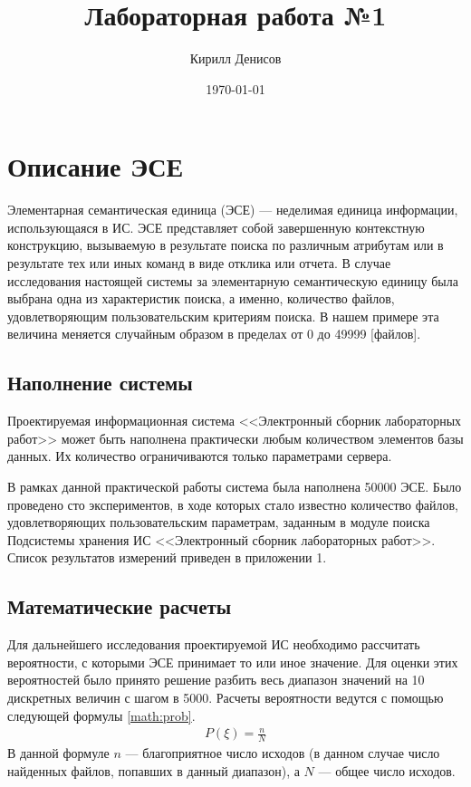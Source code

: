 \documentclass[a4paper,14pt]{extarticle}
\author{Кирилл Денисов}
\title{Лабораторная работа №1}
\date{\today}
\newcommand{\pathToCommonFolder}{/home/denilai/Documents/repos/latex/Common}
\begin{document}
	\thispagestyle{empty}
	
	\newpage
	\newpage
	
\normalsize

\section{Описание ЭСЕ}

Элементарная семантическая единица (ЭСЕ) --- неделимая единица
информации, использующаяся в ИС. ЭСЕ представляет собой завершенную
контекстную конструкцию, вызываемую в результате поиска по различным
атрибутам или в результате тех или иных команд в виде отклика или отчета. В случае исследования настоящей системы за элементарную семантическую единицу была выбрана одна из характеристик поиска, а именно, количество файлов, удовлетворяющим пользовательским критериям поиска. В нашем примере эта величина меняется случайным
образом в пределах от 0 до 49999 [файлов].


\subsection{Наполнение системы}

Проектируемая информационная система <<Электронный сборник лабораторных работ>> может быть наполнена
практически любым количеством элементов базы данных. Их количество
ограничиваются только параметрами сервера.

В рамках данной практической работы система была наполнена 50000 ЭСЕ. Было проведено сто экспериментов, в ходе которых стало известно количество файлов, удовлетворяющих пользовательским параметрам, заданным в модуле поиска Подсистемы хранения ИС <<Электронный сборник лабораторных работ>>. Список результатов измерений приведен в приложении 1.


\subsection{Математические расчеты}
Для дальнейшего исследования проектируемой ИС необходимо
рассчитать вероятности, с которыми ЭСЕ принимает то или иное значение.
Для оценки этих вероятностей было принято решение разбить весь диапазон
значений на 10 дискретных величин с шагом в 5000. Расчеты вероятности ведутся с
помощью следующей формулы  \ref{math:prob}.
\begin{align}
	P(\xi)=\frac{n}N \label{math:prob}
\end{align}
В данной формуле $n$ --- благоприятное число исходов (в данном
случае число найденных файлов, попавших в данный диапазон), а $N$ --- общее число исходов. 
\end{document}
